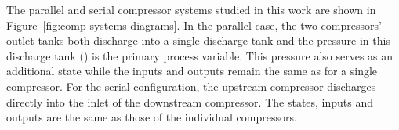 The parallel and serial compressor systems studied in this work are shown in Figure~\ref{fig:comp-systems-diagrams}.
In the parallel case, the two compressors' outlet tanks both discharge into a single discharge tank and the pressure in this discharge tank () is the primary process variable.
This pressure also serves as an additional state while the inputs and outputs remain the same as for a single compressor.
For the serial configuration, the upstream compressor discharges directly into the inlet of the downstream compressor.
The states, inputs and outputs are the same as those of the individual compressors.


